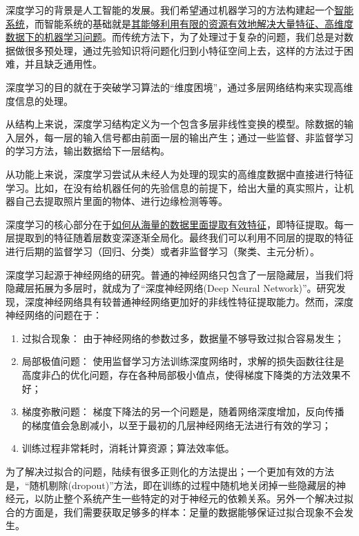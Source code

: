 
深度学习的背景是人工智能的发展。我们希望通过机器学习的方法构建起一个\uline{智能系统}，而智能系统的基础就是\uline{其能够利用有限的资源有效地解决大量特征、高维度数据下的机器学习问题}。而传统方法下，为了处理过于复杂的问题，我们总是对数据做很多预处理，通过先验知识将问题化归到小特征空间上去，这样的方法过于困难，并且缺乏通用性。\cite{Duda2001Pattern}

深度学习的目的就在于突破学习算法的“维度困境”\cite{bellman1957dynamic}，通过多层网络结构来实现高维度信息的处理。

从结构上来说，深度学习结构定义为一个包含多层非线性变换的模型。\cite{bengio2009learning}除数据的输入层外，每一层的输入信号都由前面一层的输出产生；通过一些监督、非监督学习的学习方法，输出数据给下一层结构。

从功能上来说，深度学习尝试从未经人为处理的现实的高维度数据中直接进行特征学习。比如，在没有给机器任何的先验信息的前提下，给出大量的真实照片，让机器自己去提取照片里面的物体、进行边缘检测等等。

深度学习的核心部分在于\uline{如何从海量的数据里面提取有效特征}，即特征提取。每一层提取到的特征随着层数变深逐渐全局化。最终我们可以利用不同层的提取的特征进行后期的监督学习（回归、分类）或者非监督学习（聚类、主元分析）。

深度学习起源于神经网络的研究。普通的神经网络只包含了一层隐藏层，当我们将隐藏层拓展为多层时，就成为了“深度神经网络(Deep Neural Network)”。研究发现\cite{bengio2009learning}，深度神经网络具有较普通神经网络更加好的非线性特征提取能力。然而，深度神经网络的问题在于：
\begin{enumerate}
\item 过拟合现象： 由于神经网络的参数过多，数据量不够导致过拟合容易发生；
\item 局部极值问题： 使用监督学习方法训练深度网络时，求解的损失函数往往是高度非凸的优化问题，存在各种局部极小值点，使得梯度下降类的方法效果不好；
\item 梯度弥散问题： 梯度下降法的另一个问题是，随着网络深度增加，反向传播的梯度值会急剧减小，以至于最初的几层神经网络无法进行有效的学习；
\item 训练过程非常耗时，消耗计算资源；算法效率低。
\end{enumerate}

为了解决过拟合的问题，陆续有很多正则化的方法提出；一个更加有效的方法是，“随机剔除(dropout)”方法\cite{JMLR:v15:srivastava14a}，即在训练的过程中随机地关闭掉一些隐藏层的神经元，以防止整个系统产生一些特定的对于神经元的依赖关系。另外一个解决过拟合的方面是，我们需要获取足够多的样本：足量的数据能够保证过拟合现象不会发生。

